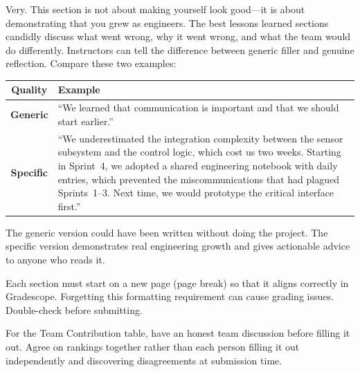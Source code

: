 \documentclass[11pt,letterpaper]{article}
\begin{document}
\begin{faqbox}
Very. This section is not about making yourself look good---it is about demonstrating that you grew as engineers. The best lessons learned sections candidly discuss what went wrong, why it went wrong, and what the team would do differently. Instructors can tell the difference between generic filler and genuine reflection. Compare these two examples:

\begin{center}
\renewcommand{\arraystretch}{1.3}
\begin{tabularx}{0.95\textwidth}{>{\bfseries\color{warnred}}c >{\raggedright\arraybackslash}X}
\toprule
\textbf{Quality} & \textbf{Example} \\
\midrule
\textcolor{warnred}{Generic} & ``We learned that communication is important and that we should start earlier.'' \\
\textcolor{tipgreen}{Specific} & ``We underestimated the integration complexity between the sensor subsystem and the control logic, which cost us two weeks. Starting in Sprint~4, we adopted a shared engineering notebook with daily entries, which prevented the miscommunications that had plagued Sprints~1--3. Next time, we would prototype the critical interface first.'' \\
\bottomrule
\end{tabularx}
\end{center}

\noindent The generic version could have been written without doing the project. The specific version demonstrates real engineering growth and gives actionable advice to anyone who reads it.
\end{faqbox}

\begin{warnbox}
Each section must start on a new page (page break) so that it aligns correctly in Gradescope. Forgetting this formatting requirement can cause grading issues. Double-check before submitting.
\end{warnbox}

\begin{tipbox}
For the Team Contribution table, have an honest team discussion before filling it out. Agree on rankings together rather than each person filling it out independently and discovering disagreements at submission time.
\end{tipbox}
\end{document}
